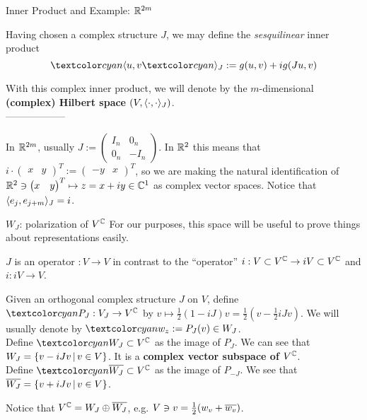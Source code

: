 \begin{frame}{Inner Product and Example: $\mathbb R^{2m}$} %
    
    Having chosen a complex structure $J$, we may define the \emph{sesquilinear} inner product \[ \defn{\bra} u, v \defn{\ket_J} := g(u, v) + ig(Ju, v) \]
    
    With this complex inner product, we will denote by  the $m$-dimensional \textbf{(complex) Hilbert space} $(V, \langle \cdot, \cdot \rangle_J)$.\\------------------
    
    In $\mathbb R^{2m}$, usually 
    $J := \begin{pmatrix} 
        I_n & 0_n \\
        0_n & -I_n
    \end{pmatrix}$. In $\mathbb R^2$ this means that $i \cdot \begin{pmatrix} x & y \end{pmatrix}^T := \begin{pmatrix} -y & x\end{pmatrix}^T $, so we are making the natural identification of $\mathbb R^2 \ni \begin{pmatrix} x & y \end{pmatrix}^T \mapsto z = x + iy \in \mathbb C^1$ as complex vector spaces. Notice that $\langle e_j, e_{j+m} \rangle_J = i$.
    
    
    
\end{frame}

\begin{frame}{$W_J$: polarization of $V^\mathbb C$} %
    For our purposes, this space will be useful to prove things about representations easily.
    
    $J$ is an operator $:V \to V$ in contrast to the ``operator'' $i: V\subset V^\mathbb C \to iV \subset V^\mathbb C$ and $i:iV \to V$.
    
    \begin{definition}
    Given an orthogonal complex structure $J$ on $V$, define $\defn{P_J}: V_J \to V^\CC$ by $v \mapsto \frac{1}{2}(1 - iJ)v = \frac{1}{2}(v - \frac{1}{2}iJv)$. We will usually denote by $\defn{w_z} := P_J(v) \in W_J$.\\
    Define $\defn{W_J} \subset V^\CC$ as the image of $P_J$. We can see that $W_J = \{v - iJv \,|\, v \in V\}$. It is a \textbf{complex vector subspace of $V^\mathbb C$}.\\
    Define $\defn{\conj{W_J}} \subset V^\CC$ as the image of $P_{-J}$. We see that $\overline{W_J} = \{v + iJv \,|\, v \in V\}$.
    \end{definition}
    
    Notice that $V^\mathbb C = W_J \oplus \overline{W_J}$, e.g. $V \ni v = \frac{1}{2}(w_v  + \overline{w_v})$.
    
\end{frame}

